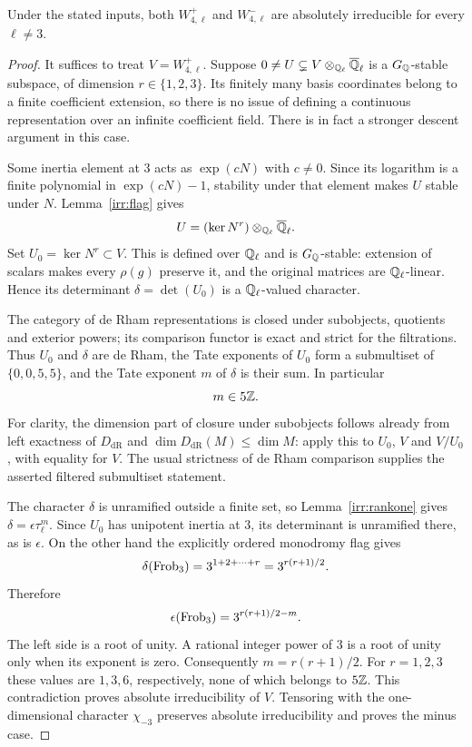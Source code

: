 \begin{theorem}\label{irr:absolute}
Under the stated inputs, both $W_{4,\ell}^+$ and $W_{4,\ell}^-$ are
absolutely irreducible for every $\ell\ne3$.
\end{theorem}
\begin{proof}
It suffices to treat $V=W_{4,\ell}^+$. Suppose
$0\ne U\subsetneq V\otimes_{\mathbb Q_\ell}\overline{\mathbb Q}_\ell$ is a
$G_\mathbb Q$-stable subspace, of dimension $r\in\{1,2,3\}$.
Its finitely many basis coordinates belong to a finite coefficient
extension, so there is no issue of defining a continuous representation
over an infinite coefficient field. There is in fact a stronger descent
argument in this case.

Some inertia element at $3$ acts as $\exp(cN)$ with $c\ne0$.
Since its logarithm is a finite polynomial in $\exp(cN)-1$, stability
under that element makes $U$ stable under $N$. Lemma~\ref{irr:flag}
gives
\[
 U=(\ker N^r)\otimes_{\mathbb Q_\ell}\overline{\mathbb Q}_\ell.
\]
Set $U_0=\ker N^r\subset V$. This is defined over $\mathbb Q_\ell$ and is
$G_\mathbb Q$-stable: extension of scalars makes every $\rho(g)$ preserve it,
and the original matrices are $\mathbb Q_\ell$-linear. Hence its determinant
$\delta=\det(U_0)$ is a $\mathbb Q_\ell$-valued character.

The category of de Rham representations is closed under subobjects,
quotients and exterior powers; its comparison functor is exact and
strict for the filtrations. Thus $U_0$ and $\delta$ are de Rham, the Tate
exponents of $U_0$ form a submultiset of $\{0,0,5,5\}$, and the
Tate exponent $m$ of $\delta$ is their sum. In particular
\[
 m\in5\mathbb Z.
\]
For clarity, the dimension part of closure under subobjects follows already
from left exactness of $D_{\mathrm{dR}}$ and
$\dim D_{\mathrm{dR}}(M)\le\dim M$: apply this to $U_0$, $V$ and
$V/U_0$, with equality for $V$. The usual strictness of de Rham
comparison supplies the asserted filtered submultiset statement.

The character $\delta$ is unramified outside a finite set, so
Lemma~\ref{irr:rankone} gives $\delta=\epsilon\tau_\ell^m$.
Since $U_0$ has unipotent inertia at $3$, its determinant is unramified
there, as is $\epsilon$. On the other hand the explicitly ordered
monodromy flag gives
\[
 \delta(\operatorname{Frob}_3)=3^{1+2+\cdots+r}=3^{r(r+1)/2}.
\]
Therefore
\[
 \epsilon(\operatorname{Frob}_3)=3^{r(r+1)/2-m}.
\]
The left side is a root of unity. A rational integer power of $3$
is a root of unity only when its exponent is zero. Consequently
$m=r(r+1)/2$. For $r=1,2,3$ these values are $1,3,6$, respectively,
none of which belongs to $5\mathbb Z$. This contradiction proves absolute
irreducibility of $V$. Tensoring with the one-dimensional character
$\chi_{-3}$ preserves absolute irreducibility and proves the minus case.
\end{proof}

